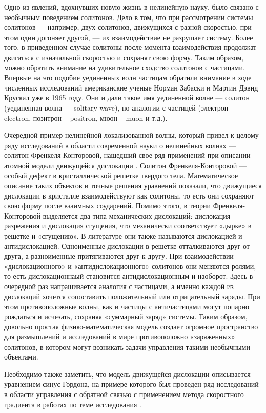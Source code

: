 Одно из явлений, вдохнувших новую жизнь в нелинейную науку, было связано с необычным поведением солитонов. Дело в том, что при рассмотрении системы солитонов --- например, двух солитонов, движущихся с разной скоростью, при этом один догоняет другой, --- их взаимодействие не разрушает систему. Более того, в приведенном случае солитоны после момента взаимодействия продолжат двигаться с изначальной скоростью и сохранят свою форму. Таким образом, можно обратить внимание на удивительное сходство солитонов с частицами. Впервые на это подобие уединенных волн частицам обратили внимание в ходе численных исследований американские ученые Норман Забаски и Мартин Дэвид Крускал уже в 1965 \cite{Zab} году. Они и дали такое имя уединенной волне — солитон (уединенная волна --- solitary wave), по аналогии с частицей (электрон -- electron, позитрон -- positron, мюон -- muon и т.д.).

Очередной пример нелинейной локализованной волны, который привел к целому ряду исследований в области современной науки о нелинейных волнах --- солитон Френкеля Конторовой, нашедший свое ряд применений при описании атомной модели движущейся дислокации \cite{intro_braun}. Солитон Френкеля-Конторовой --- особый дефект в кристаллической решетке твердого тела. Математическое описание таких объектов и точные решения уравнений показали, что движущиеся дислокации в кристалле взаимодействуют как солитоны, то есть они сохраняют свою форму после взаимных соударений. Помимо этого, в теории Френкеля-Конторовой выделяется два типа механических дислокаций: дислокация разрежения и дислокация сгущения, что механически соответствует «дырке» в решетке и «сгущению». В литературе они также называются дислокацией и антидислокацией. Одноименные дислокации в решетке отталкиваются друг от друга, а разноименные притягиваются друг к другу. При взаимодействии «дислокационного» и «антидислокационного» солитонов они меняются ролями, то есть дислокационнаый становится антидислокационным и наоборот. Здесь в очередной раз напрашивается аналогия с частицами, а именно каждой из дислокаций хочется сопоставить положительный или отрицательный заряды. При этом противоположные волны, как и частицы с античастицами могут попарно рождаться и исчезать, сохраняя «суммарный заряд» системы. Таким образом, довольно простая физико-математическая модель создает огромное пространство для размышлений и исследований в мире противоположно «заряженных» солитонов, в котором могут возникать задачи управления такими необычными объектами.

Необходимо также заметить, что модель движущейся дислокации описывается уравнением синус-Гордона, на примере которого был проведен ряд исследований в области управления с обратной связью с применением метода скоростного градиента в работах по теме исследования \cite{porant16, porant17, PorubovAntonov2018mechSystem, PorubovAntonov2017JoPFurther}.

